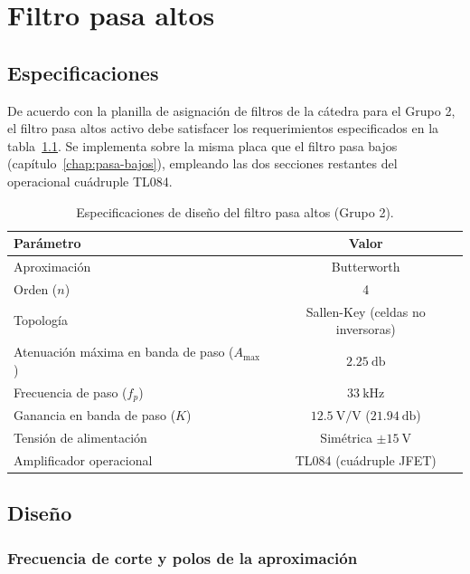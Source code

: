 \chapter{Filtro pasa altos}
\label{chap:pasa-altos}

\section{Especificaciones}
\label{sec:pa-especificaciones}

De acuerdo con la planilla de asignación de filtros de la cátedra para el Grupo 2, el filtro pasa altos activo debe
satisfacer los requerimientos especificados en la tabla~\ref{tab:pa-especificaciones}. Se implementa sobre la misma
placa que el filtro pasa bajos (capítulo~\ref{chap:pasa-bajos}), empleando las dos secciones restantes del
operacional cuádruple TL084.

\begin{table}[!ht]
  \centering
  \begin{tabular}{|l|c|}
    \hline
    Parámetro & Valor \\
    \hline
    Aproximación & Butterworth \\
    Orden ($n$) & 4 \\
    Topología & Sallen-Key (celdas no inversoras) \\
    Atenuación máxima en banda de paso ($A_{\max}$) & $\SI{2.25}{\decibel}$ \\
    Frecuencia de paso ($f_p$) & $\SI{33}{\kilo\hertz}$ \\
    Ganancia en banda de paso ($K$) & $\SI{12.5}{\volt/\volt}$ ($\SI{21.94}{\decibel}$) \\
    Tensión de alimentación & Simétrica $\pm\SI{15}{\volt}$ \\
    Amplificador operacional & TL084 (cuádruple JFET) \\
    \hline
  \end{tabular}
  \caption{Especificaciones de diseño del filtro pasa altos (Grupo 2).}
  \label{tab:pa-especificaciones}
\end{table}

\section{Diseño}
\label{sec:pa-diseno}

\subsection{Frecuencia de corte y polos de la aproximación}
\label{subsec:pa-polos}

